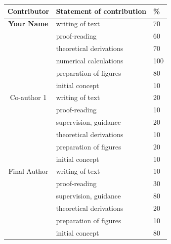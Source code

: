 \cleartoevenpage
\pagestyle{empty}	%

\noindent


\begin{table}[h]
	\begin{center}
	\begin{tabular}{|c|l|l|}
		\hline
		Contributor & Statement of contribution & \% \\
		\hline
		\textbf{Your Name}				& writing of text 					& 70\\
															& proof-reading							& 60 \\
															& theoretical derivations 	& 70\\
															& numerical calculations 		& 100\\
															& preparation of figures 		& 80 \\
															& initial concept						& 10 \\
		\hline
		Co-author 1								& writing of text 					& 20\\
															& proof-reading							& 10 \\
															& supervision, guidance 		& 20\\
															& theoretical derivations 	& 10\\
															& preparation of figures 		& 20 \\
															& initial concept						& 10 \\
		\hline
		Final Author							& writing of text 					& 10\\
															& proof-reading							& 30 \\
															& supervision, guidance 		& 80 \\
															& theoretical derivations 	& 20 \\
															& preparation of figures 		& 10 \\
															& initial concept						& 80 \\
		\hline
	\end{tabular}
	\end{center}
\end{table}

